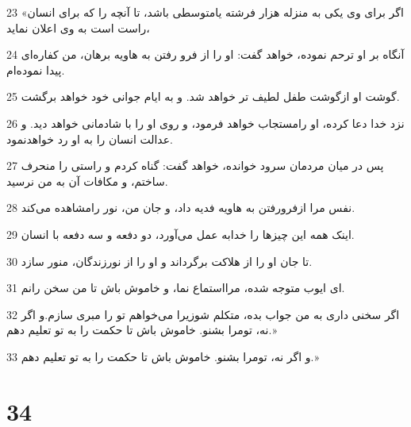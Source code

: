 \par 23 «اگر برای وی یکی به منزله هزار فرشته یامتوسطی باشد، تا آنچه را که برای انسان راست است به وی اعلان نماید،
\par 24 آنگاه بر او ترحم نموده، خواهد گفت: او را از فرو رفتن به هاویه برهان، من کفاره‌ای پیدا نموده‌ام.
\par 25 گوشت او ازگوشت طفل لطیف تر خواهد شد. و به ایام جوانی خود خواهد برگشت.
\par 26 نزد خدا دعا کرده، او رامستجاب خواهد فرمود، و روی او را با شادمانی خواهد دید. و عدالت انسان را به او رد خواهدنمود.
\par 27 پس در میان مردمان سرود خوانده، خواهد گفت: گناه کردم و راستی را منحرف ساختم، و مکافات آن به من نرسید.
\par 28 نفس مرا ازفرورفتن به هاویه فدیه داد، و جان من، نور رامشاهده می‌کند.
\par 29 اینک همه این چیزها را خدابه عمل می‌آورد، دو دفعه و سه دفعه با انسان.
\par 30 تا جان او را از هلاکت برگرداند و او را از نورزندگان، منور سازد.
\par 31 ‌ای ایوب متوجه شده، مرااستماع نما، و خاموش باش تا من سخن رانم.
\par 32 اگر سخنی داری به من جواب بده، متکلم شوزیرا می‌خواهم تو را مبری سازم.و اگر نه، تومرا بشنو. خاموش باش تا حکمت را به تو تعلیم دهم.»
\par 33 و اگر نه، تومرا بشنو. خاموش باش تا حکمت را به تو تعلیم دهم.»
 
\chapter{34}


